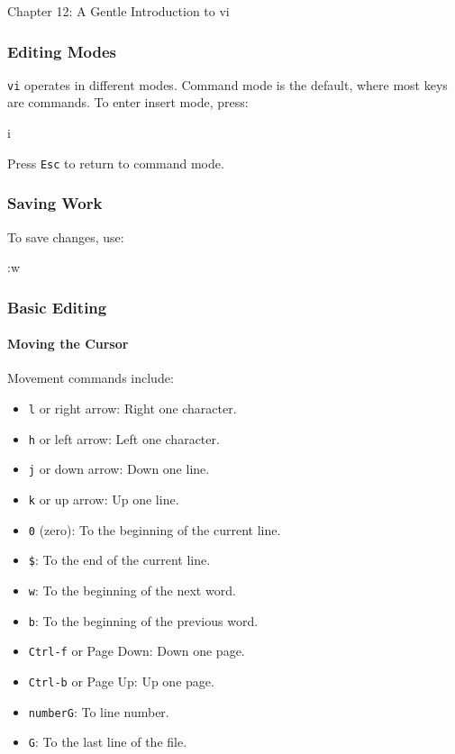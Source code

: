 \begin{notes}{Chapter 12: A Gentle Introduction to vi}
    \subsubsection*{Editing Modes}

    \texttt{vi} operates in different modes. Command mode is the default, where most keys are commands. To enter insert mode, press:
    \begin{highlight}
    \begin{code}[Pseudo]
    i
    \end{code}
    \end{highlight}

    Press \texttt{Esc} to return to command mode.

    \subsubsection*{Saving Work}

    To save changes, use:
    \begin{highlight}
    \begin{code}[Pseudo]
    :w
    \end{code}
    \end{highlight}

    \subsubsection*{Basic Editing}

    \paragraph*{Moving the Cursor}

    Movement commands include:
    \begin{itemize}
        \item \texttt{l} or right arrow: Right one character.
        \item \texttt{h} or left arrow: Left one character.
        \item \texttt{j} or down arrow: Down one line.
        \item \texttt{k} or up arrow: Up one line.
        \item \texttt{0} (zero): To the beginning of the current line.
        \item \texttt{\$}: To the end of the current line.
        \item \texttt{w}: To the beginning of the next word.
        \item \texttt{b}: To the beginning of the previous word.
        \item \texttt{Ctrl-f} or Page Down: Down one page.
        \item \texttt{Ctrl-b} or Page Up: Up one page.
        \item \texttt{numberG}: To line number.
        \item \texttt{G}: To the last line of the file.
    \end{itemize}


\end{notes}
